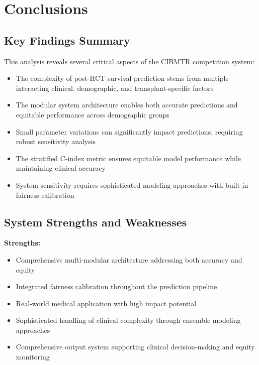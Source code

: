 \section{Conclusions}

\subsection{Key Findings Summary}

This analysis reveals several critical aspects of the CIBMTR competition system:

\begin{itemize}
    \item The complexity of post-HCT survival prediction stems from multiple interacting clinical, demographic, and transplant-specific factors
    \item The modular system architecture enables both accurate predictions and equitable performance across demographic groups
    \item Small parameter variations can significantly impact predictions, requiring robust sensitivity analysis
    \item The stratified C-index metric ensures equitable model performance while maintaining clinical accuracy
    \item System sensitivity requires sophisticated modeling approaches with built-in fairness calibration
\end{itemize}

\subsection{System Strengths and Weaknesses}

\textbf{Strengths:}

\begin{itemize}
    \item Comprehensive multi-modular architecture addressing both accuracy and equity \cite{kaggle_competition}
    \item Integrated fairness calibration throughout the prediction pipeline
    \item Real-world medical application with high impact potential \cite{astct_simplification}
    \item Sophisticated handling of clinical complexity through ensemble modeling approaches \cite{frontiers_ai_hct}
    \item Comprehensive output system supporting clinical decision-making and equity monitoring
\end{itemize}

